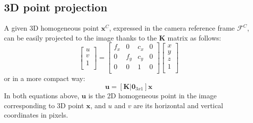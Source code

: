 \subsection{3D point projection}
A given 3D homogeneous point $\mathbf{x}^C$, expressed in the camera reference frame $\mathcal{F}^C$, can be easily projected to the image thanks to the $\mathbf{K}$ matrix as follows: 
\begin{equation}
 \left[
 \begin{array}{c}
  u\\
  v\\
  1\\
 \end{array}
 \right] = 
 \left[
 \begin{array}{cccc}
  f_x & 0 & c_x & 0\\
  0 & f_y & c_y & 0\\
  0 & 0 & 1 & 0\\
 \end{array}
 \right]
 \left[
 \begin{array}{c}
  x\\
  y\\
  z\\
  1\\
 \end{array}
 \right]
\end{equation}
or in a more compact way: 
\begin{equation}
\label{eq:general_projection}
 \mathbf{u} = \left[\mathbf{K} \vert \mathbf{0}_{3x1} \right] \mathbf{x}
\end{equation}
In both equations above, $\mathbf{u}$ is the 2D homogeneous point in the image corresponding to 3D point $\mathbf{x}$, and $u$ and $v$ are its horizontal and vertical coordinates in pixels.

